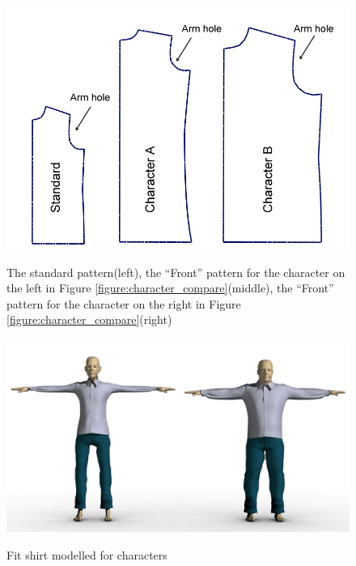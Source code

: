 \begin{figure}[H]
	\centering
	\includegraphics[width=1\columnwidth]{../images/sknny_fatty_front_pattern}\\[0.1cm]
    \caption[``Front'' pattern for both character in Figure \ref{figure:character_compare}]{The standard pattern(left), the ``Front'' pattern for the character on the left in Figure \ref{figure:character_compare}(middle), the ``Front'' pattern for the character on the right in Figure \ref{figure:character_compare}(right)}
    \label{figure:front_compare}
\end{figure}

\begin{figure}[H]
	\centering
	\includegraphics[width=1\columnwidth]{../images/sknny_fatty_fit_shirt}\\[0.1cm]
    \caption{Fit shirt modelled for characters}
    \label{figure:fit_shirt_compare}
\end{figure}

